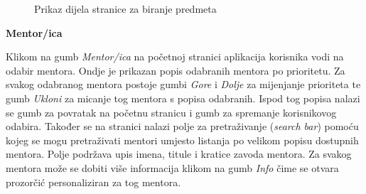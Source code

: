 \documentclass[times, utf8, zavrsni, numeric]{fer}
\begin{document}
        \begin{figure} [H]
          \centering
          \caption{Prikaz dijela stranice za biranje predmeta}
        \end{figure}
        
        \noindent\textbf{Mentor/ica}
        
        Klikom na gumb \textit{Mentor/ica} na početnoj stranici aplikacija korisnika vodi na odabir mentora. Ondje je prikazan popis odabranih mentora po prioritetu. Za svakog odabranog mentora postoje gumbi \textit{Gore} i \textit{Dolje} za mijenjanje prioriteta te gumb \textit{Ukloni} za micanje tog mentora s popisa odabranih. Ispod tog popisa nalazi se gumb za povratak na početnu stranicu i gumb za spremanje korisnikovog odabira. Također se na stranici nalazi polje za pretraživanje (\textit{search bar}) pomoću kojeg se mogu pretraživati mentori umjesto listanja po velikom popisu dostupnih mentora. Polje podržava upis imena, titule i kratice zavoda mentora. Za svakog mentora može se dobiti više informacija klikom na gumb \textit{Info} čime se otvara prozorčić personaliziran za tog mentora.
        
\end{document}
